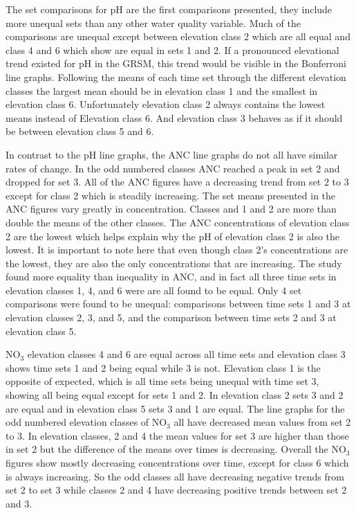 
The set comparisons for pH are the first comparisons presented, they include more unequal sets than any other water quality variable.
Much of the comparisons are unequal except between elevation class 2 which are all equal and class 4 and 6 which show are equal in sets 1 and 2.
If a pronounced elevational trend existed for pH in the GRSM, this trend would be visible in the Bonferroni line graphs.
Following the means of each time set through the different elevation classes the largest mean should be in elevation class 1 and the smallest in elevation class 6.
Unfortunately elevation class 2 always contains the lowest means instead of Elevation class 6.
And elevation class 3 behaves as if it should be between elevation class 5 and 6.

In contrast to the pH line graphs, the ANC line graphs do not all have similar rates of change.
In the odd numbered classes ANC reached a peak in set 2 and dropped for set 3.
All of the ANC figures have a decreasing trend from set 2 to 3 except for class 2 which is steadily increasing. 
The set means presented in the ANC figures vary greatly in concentration.
Classes and 1 and 2 are more than double the means of the other classes.
The ANC concentrations of elevation class 2 are the lowest which helps explain why the pH of elevation class 2 is also the lowest.
It is important to note here that even though class 2's concentrations are the lowest, they are also the only concentrations that are increasing.
The study found more equality than inequality in ANC, and in fact all three time sets in elevation classes 1, 4, and 6 were are all found to be equal.  
Only 4 set comparisons were found to be unequal: comparisons between time sets 1 and 3 at elevation classes 2, 3, and 5, and the comparison between time sets 2 and 3 at elevation class 5.

NO$_3$ elevation classes 4 and 6 are equal across all time sets and elevation class 3 shows time sets 1 and 2 being equal while 3 is not.  
Elevation class 1 is the opposite of expected, which is all time sets being unequal with time set 3, showing all being equal except for sets 1 and 2.  
In elevation class 2 sets 3 and 2 are equal and in elevation class 5 sets 3 and 1 are equal.
The line graphs for the odd numbered elevation classes of NO$_3$ all have decreased mean values from set 2 to 3.
In elevation classes, 2 and 4 the mean values for set 3 are higher than those in set 2 but the difference of the means over times is decreasing.
Overall the NO$_3$ figures show mostly decreasing concentrations over time, except for class 6 which is always increasing.
So the odd classes all have decreasing negative trends from set 2 to set 3 while classes 2 and 4 have decreasing positive trends between set 2 and 3.

